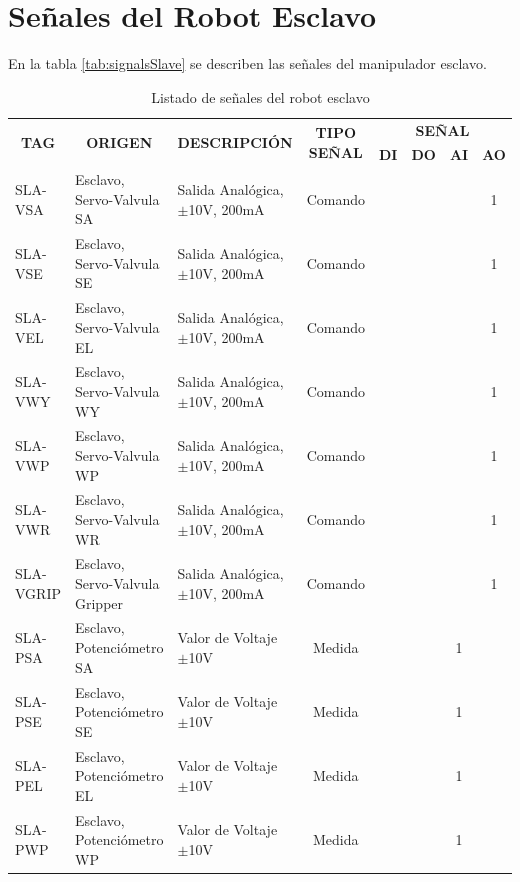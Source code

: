 \section{Señales del Robot Esclavo}
En la tabla \ref{tab:signalsSlave} se describen las señales del manipulador esclavo.
\begin{table}
  \centering
  \caption{Listado de señales del robot esclavo}
    \begin{tabular}{lllccccc}
    \toprule
    \multicolumn{1}{c}{\multirow{2}{*}{\textbf{TAG}}} & \multicolumn{1}{c}{\multirow{2}{*}{\textbf{ORIGEN}}} & \multicolumn{1}{c}{\multirow{2}{*}{\textbf{DESCRIPCIÓN}}} & \multicolumn{1}{c}{\multirow{2}{*}{\textbf{TIPO SEÑAL}}} & \multicolumn{4}{c}{\textbf{SEÑAL}} \\  
  &  &  & & \textbf{DI} & \textbf{DO} & \textbf{AI} & \textbf{AO} \\
    \midrule
  	SLA-VSA & Esclavo, Servo-Valvula SA & Salida Analógica, $\pm$10V, 200mA & Comando &       &       &       & 1 \\
    SLA-VSE & Esclavo, Servo-Valvula SE & Salida Analógica, $\pm$10V, 200mA & Comando &       &       &       & 1 \\
    SLA-VEL & Esclavo, Servo-Valvula EL & Salida Analógica, $\pm$10V, 200mA & Comando &       &       &       & 1 \\
    SLA-VWY & Esclavo, Servo-Valvula WY & Salida Analógica, $\pm$10V, 200mA & Comando &       &       &       & 1 \\
    SLA-VWP & Esclavo, Servo-Valvula WP & Salida Analógica, $\pm$10V, 200mA & Comando &       &       &       & 1 \\
    SLA-VWR & Esclavo, Servo-Valvula WR & Salida Analógica, $\pm$10V, 200mA & Comando &       &       &       & 1 \\
    SLA-VGRIP & Esclavo, Servo-Valvula Gripper & Salida Analógica, $\pm$10V, 200mA & Comando &       &       &       & 1 \\
    SLA-PSA & Esclavo, Potenciómetro SA & Valor de Voltaje $\pm$10V & Medida &       &       & 1     &  \\
    SLA-PSE & Esclavo, Potenciómetro SE & Valor de Voltaje $\pm$10V & Medida &       &       & 1     &  \\
    SLA-PEL & Esclavo, Potenciómetro EL & Valor de Voltaje $\pm$10V & Medida &       &       & 1     &  \\
    SLA-PWP & Esclavo, Potenciómetro WP & Valor de Voltaje $\pm$10V & Medida &       &       & 1     &  \\

\end{tabular}
\end{table}
